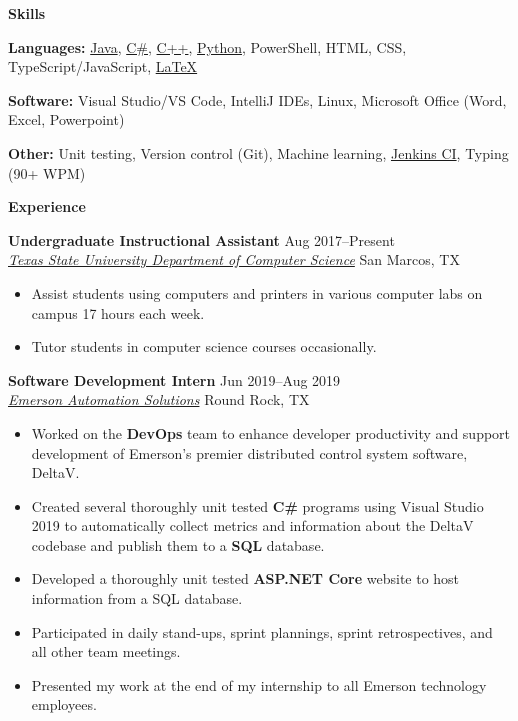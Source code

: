 \documentclass[10pt]{article}
\newlength{\headingborderwidth}
\newcommand{\resheading}[1]{
    \begin{mdframed}[
        backgroundcolor=black!15,
        linewidth=\headingborderwidth,
        innertopmargin=4pt,
        innerbottommargin=4pt,
        skipabove=6pt,
        skipbelow=2pt]
        \textbf{\large #1}
    \end{mdframed}
}
\newcommand{\ressubheading}[4]{
    \textbf{#1} \hfill #2 \\[0pt]
    \textit{#3} \hfill #4 \\[0pt]
}
\newenvironment{resitemize}{
    \vspace{-6pt}
    \begin{itemize}
    \setlength\itemsep{-2pt}
}{
    \end{itemize}
}
\begin{document}
\begin{NoHyper}
%
%

\resheading{Skills}

\textbf{Languages:}
    \href{https://en.wikipedia.org/wiki/Java_(programming_language)}{Java},    
    \href{https://en.wikipedia.org/wiki/C_Sharp_(programming_language)}{C\#},
    \href{https://en.wikipedia.org/wiki/C\%2B\%2B}{C++},
    \href{https://www.python.org/}{Python},
    PowerShell,
    HTML, CSS, TypeScript/JavaScript,
    \href{https://www.latex-project.org/}{\LaTeX}

\textbf{Software:}
    Visual Studio/VS Code,
    IntelliJ IDEs,
    Linux,
    Microsoft Office (Word, Excel, Powerpoint)


\textbf{Other:}
    Unit testing,
    Version control (Git),
    Machine learning,
    \href{https://jenkins.io/}{Jenkins CI},
    Typing (90+ WPM)

%
%

\resheading{Experience}

\ressubheading
	{Undergraduate Instructional Assistant}
	{Aug 2017--Present}
	{\href{https://cs.txstate.edu/accounts/lab_assistants/}{Texas State University Department of Computer Science}}
	{San Marcos, TX}
	\begin{resitemize}
		\item Assist students using computers and printers in various computer labs on campus 17 hours each week.
		\item Tutor students in computer science courses occasionally.
	\end{resitemize}

\ressubheading
	{Software Development Intern}
	{Jun 2019--Aug 2019}
	{\href{https://www.emerson.com/en-us/automation-solutions}{Emerson Automation Solutions}}
	{Round Rock, TX}
    \begin{resitemize}
        \item Worked on the \textbf{DevOps} team to enhance developer productivity and support development of Emerson's premier distributed control system software, DeltaV.
        \item Created several thoroughly unit tested \textbf{C\#} programs using Visual Studio 2019 to automatically collect metrics and information about the DeltaV codebase and publish them to a \textbf{SQL} database.
        \item Developed a thoroughly unit tested \textbf{ASP.NET Core} website to host information from a SQL database.
        \item Participated in daily stand-ups, sprint plannings, sprint retrospectives, and all other team meetings.
        \item Presented my work at the end of my internship to all Emerson technology  employees.
    \end{resitemize}


\end{NoHyper}
\end{document}
